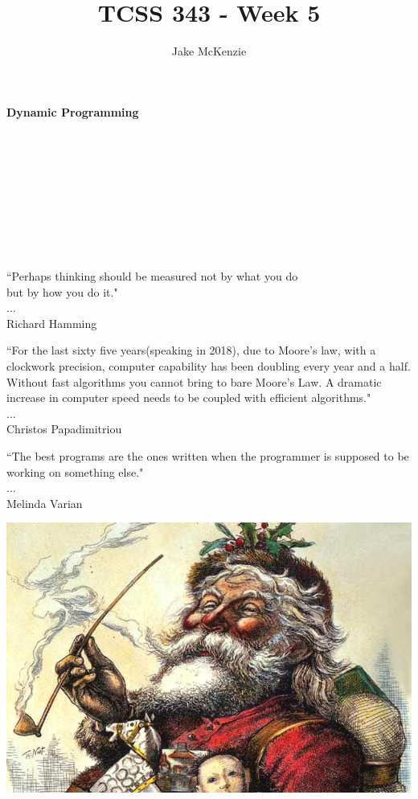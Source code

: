\documentclass[12pt]{article}
\begin{document}
\title{TCSS 343 - Week 5}
\author{Jake McKenzie}
\maketitle
\noindent\centerline{\textbf{Dynamic Programming}}\\\\\\\\\\\\\\\\
\begin{center}
    ``Perhaps thinking should be measured not by what you do \\but by how you do it." \\$\dots$\\ Richard Hamming
\end{center}
\begin{center}
    ``For the last sixty five years(speaking in 2018), due to Moore's law, with a clockwork precision, computer capability has been doubling every year and a half. Without fast algorithms you cannot bring to bare Moore's Law. A dramatic increase in computer speed needs to be coupled with efficient algorithms." \\$\dots$\\ Christos Papadimitriou
\end{center}
\begin{center}
    ``The best programs are the ones written when the programmer is supposed to be working on something else." \\$\dots$\\ Melinda Varian
\end{center}
\newpage
\noindent\includegraphics[scale = .3]{santa.jpg}\\
\end{document}
